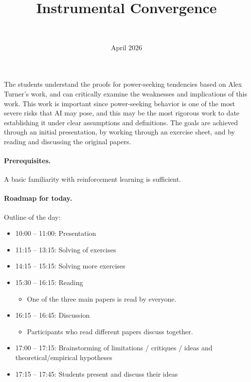 \documentclass[11pt]{article}
\title{Instrumental Convergence}
\author{\authorname{Leon Lang}\\ \affiliation{ILIAD}}
\date{April 2026}
\begin{document}
\maketitle

\begin{learningoutcomes}
The students understand the proofs for power-seeking tendencies based on Alex
Turner's work, and can critically examine the weaknesses and implications of
this work. This work is important since power-seeking behavior is one of the
most severe risks that AI may pose, and this may be the most rigorous work to
date establishing it under clear assumptions and definitions. The goals are
achieved through an initial presentation, by working through an exercise sheet,
and by reading and discussing the original papers.
\end{learningoutcomes}

\paragraph{Prerequisites.}

A basic familiarity with reinforcement learning is sufficient.

\paragraph{Roadmap for today.}

Outline of the day:

\begin{itemize}
  \item 10:00 -- 11:00: Presentation
  \item 11:15 -- 13:15: Solving of exercises
  \item 14:15 -- 15:15: Solving more exercises
  \item 15:30 -- 16:15: Reading
\begin{itemize}
  \item One of the three main papers is read by everyone.
\end{itemize}
  \item 16:15 -- 16:45: Discussion
\begin{itemize}
  \item Participants who read different papers discuss together.
\end{itemize}
  \item 17:00 -- 17:15: Brainstorming of limitations / critiques / ideas and theoretical/empirical hypotheses
  \item 17:15 -- 17:45: Students present and discuss their ideas
\end{itemize}
\end{document}
